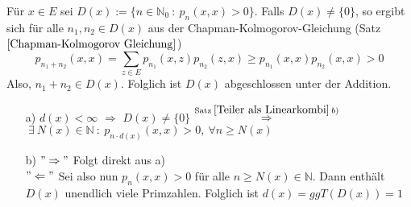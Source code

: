 Für $x \in E$ sei $D(x) := \lbrace n \in \mathbb{N}_{0} \: : \: p_{n}(x,x)>0 \rbrace$. Falls $D(x) \neq \lbrace 0 \rbrace$, so ergibt sich für alle $n_{1},n_{2} \in D(x)$ aus der Chapman-Kolmogorov-Gleichung (Satz $\ref{Chapman-Kolmogorov Gleichung}$)
\begin{equation*}
p_{n_{1} + n_{2}}(x,x) = \sum_{z \in E} p_{n_{1}}(x,z)p_{n_{2}}(z,x) \geq p_{n_{1}}(x,x)p_{n_{2}}(x,x) > 0 
\end{equation*}
Also, $n_{1} + n_{2} \in D(x)$. Folglich ist $D(x)$ abgeschlossen unter der Addition.
\begin{itemize}
\item[a)] $d(x) < \infty$ $\Rightarrow$ $D(x) \neq \lbrace 0 \rbrace$ $\stackrel{\mathrm{Satz} \: \ref{Teiler als Linearkombi} \: b)}{\Rightarrow}$ $\: \exists \: N(x) \in \mathbb{N} \: : \: p_{n \cdot d(x)}(x,x) > 0, \: \forall n \geq N(x)$
\item[b)] $"\Rightarrow"$ Folgt direkt aus a)
\\
$"\Leftarrow"$ Sei also nun $p_{n}(x,x)>0$ für alle $n \geq N(x) \in \mathbb{N}$. Dann enthält $D(x)$ unendlich viele Primzahlen. Folglich ist $d(x)=ggT(D(x))=1$
\end{itemize}